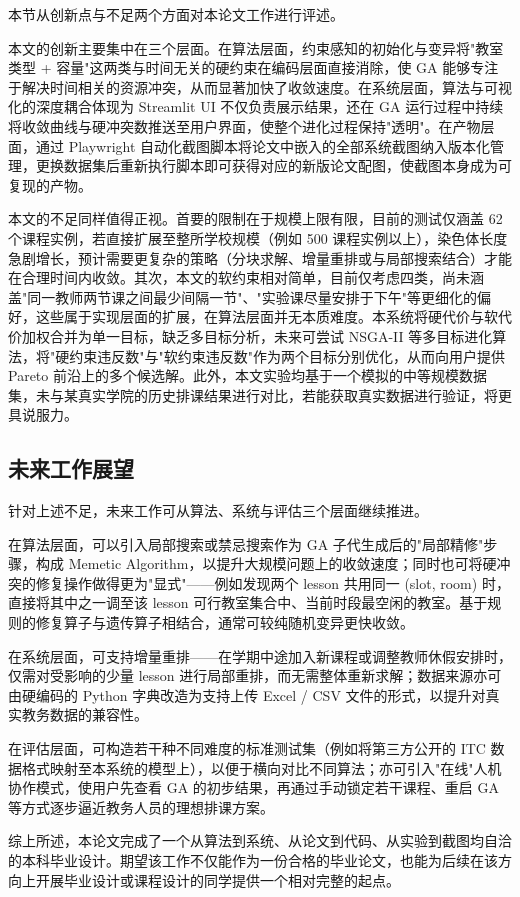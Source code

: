 本节从创新点与不足两个方面对本论文工作进行评述。

本文的创新主要集中在三个层面。在算法层面，约束感知的初始化与变异将"教室类型 + 容量"这两类与时间无关的硬约束在编码层面直接消除，使 GA 能够专注于解决时间相关的资源冲突，从而显著加快了收敛速度。在系统层面，算法与可视化的深度耦合体现为 Streamlit UI 不仅负责展示结果，还在 GA 运行过程中持续将收敛曲线与硬冲突数推送至用户界面，使整个进化过程保持"透明"。在产物层面，通过 Playwright 自动化截图脚本将论文中嵌入的全部系统截图纳入版本化管理，更换数据集后重新执行脚本即可获得对应的新版论文配图，使截图本身成为可复现的产物。

本文的不足同样值得正视。首要的限制在于规模上限有限，目前的测试仅涵盖 62 个课程实例，若直接扩展至整所学校规模（例如 500 课程实例以上），染色体长度急剧增长，预计需要更复杂的策略（分块求解、增量重排或与局部搜索结合）才能在合理时间内收敛。其次，本文的软约束相对简单，目前仅考虑四类，尚未涵盖"同一教师两节课之间最少间隔一节"、"实验课尽量安排于下午"等更细化的偏好，这些属于实现层面的扩展，在算法层面并无本质难度。本系统将硬代价与软代价加权合并为单一目标，缺乏多目标分析，未来可尝试 NSGA-II 等多目标进化算法，将"硬约束违反数"与"软约束违反数"作为两个目标分别优化，从而向用户提供 Pareto 前沿上的多个候选解。此外，本文实验均基于一个模拟的中等规模数据集，未与某真实学院的历史排课结果进行对比，若能获取真实数据进行验证，将更具说服力。

\subsection{未来工作展望}

针对上述不足，未来工作可从算法、系统与评估三个层面继续推进。

在算法层面，可以引入局部搜索或禁忌搜索作为 GA 子代生成后的"局部精修"步骤，构成 Memetic Algorithm，以提升大规模问题上的收敛速度；同时也可将硬冲突的修复操作做得更为"显式"——例如发现两个 lesson 共用同一 (slot, room) 时，直接将其中之一调至该 lesson 可行教室集合中、当前时段最空闲的教室。基于规则的修复算子与遗传算子相结合，通常可较纯随机变异更快收敛。

在系统层面，可支持增量重排——在学期中途加入新课程或调整教师休假安排时，仅需对受影响的少量 lesson 进行局部重排，而无需整体重新求解；数据来源亦可由硬编码的 Python 字典改造为支持上传 Excel / CSV 文件的形式，以提升对真实教务数据的兼容性。

在评估层面，可构造若干种不同难度的标准测试集（例如将第三方公开的 ITC 数据格式映射至本系统的模型上），以便于横向对比不同算法；亦可引入"在线"人机协作模式，使用户先查看 GA 的初步结果，再通过手动锁定若干课程、重启 GA 等方式逐步逼近教务人员的理想排课方案。

综上所述，本论文完成了一个从算法到系统、从论文到代码、从实验到截图均自洽的本科毕业设计。期望该工作不仅能作为一份合格的毕业论文，也能为后续在该方向上开展毕业设计或课程设计的同学提供一个相对完整的起点。
